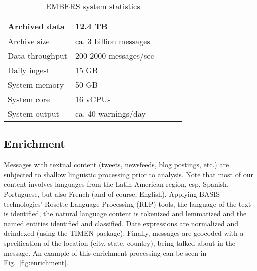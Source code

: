 
\begin{table}
\caption{EMBERS system statistics}
 \centering
 \begin{tabular}{|l|l|l|l|l|}
 \hline
 Archived data     & 12.4 TB                  \\ \hline
 Archive size & ca. 3 billion messages   \\ \hline
 Data throughput   & 200-2000 messages/sec  \\ \hline
 Daily ingest & 15 GB \\ \hline
 System memory & 50 GB \\ \hline
 System core & 16 vCPUs \\ \hline
 System output & ca. 40 warnings/day \\ \hline
\end{tabular}
\label{tab:stats}
\end{table}


\subsection{Enrichment}

Messages with textual content (tweets, newsfeeds, blog postings, etc.)
are subjected to shallow linguistic processing prior to analysis. Note that
most of our content involves languages from the Latin American region, esp.
Spanish, Portuguese, but also French (and of course, English). Applying
BASIS technologies' Rosette Language Processing (RLP) tools, the language of
the text is identified, the natural language content is tokenized and
lemmatized and the named entities identified and classified. Date
expressions are normalized and deindexed (using the
TIMEN \cite{LlorensDGS12} package).  Finally, messages are geocoded with a specification
of the location (city, state, country), being talked about in the message.
An example of this enrichment processing can be seen in
Fig.~\ref{fig:enrichment}.


%
%


